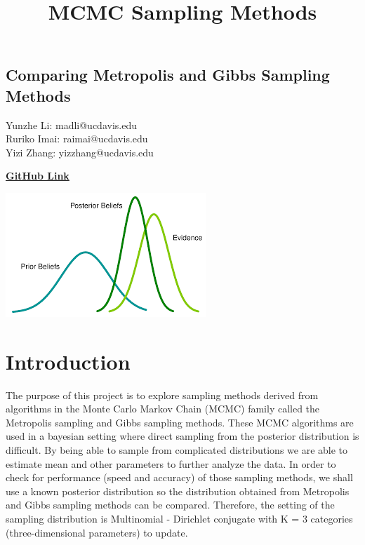 \documentclass[11pt,a4paper]{article}
\begin{document}
\title{MCMC Sampling Methods}
\pagestyle{fancy}

{
\fancyhf{}
\cfoot{\thepage}
}

\vspace*{\fill}
\begin{center}
\subsection*{ 
\huge Comparing Metropolis and Gibbs Sampling Methods
}
\end{center}

\begin{center}
Yunzhe Li: madli@ucdavis.edu \\
Ruriko Imai: raimai@ucdavis.edu \\
Yizi Zhang: yizzhang@ucdavis.edu
\end{center}

\begin{center}
\href{https://github.com/imaination/Bayesian}{\textbf{GitHub Link}}
\end{center}

\bigskip
\bigskip
\bigskip
\bigskip
\bigskip
\bigskip
\bigskip
\bigskip
\bigskip
\bigskip
\bigskip
\bigskip


\begin{center}
\includegraphics[scale=1.5]{images/cover.png}
\end{center}
\vspace*{\fill}
\newpage


\section*{Introduction}
The purpose of this project is to explore sampling methods derived from algorithms in the Monte Carlo Markov Chain (MCMC) family called the Metropolis sampling and Gibbs sampling methods. These MCMC algorithms are used in a bayesian setting where direct sampling from the posterior distribution is difficult. By being able to sample from complicated distributions we are able to estimate mean and other parameters to further analyze the data. In order to check for performance (speed and accuracy) of those sampling methods, we shall use a known posterior distribution so the distribution obtained from Metropolis and Gibbs sampling methods can be compared. Therefore, the setting of the sampling distribution is Multinomial - Dirichlet conjugate with K = 3 categories (three-dimensional parameters) to update. 
\end{document}
